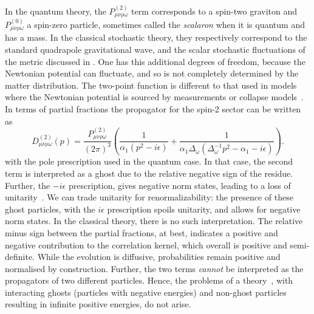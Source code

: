 \documentclass[aps,preprintnumbers,superscriptaddress,longbibliography]{revtex4-1}
\begin{document}
In the quantum theory, the $P^{(2)}_{\mu \nu \rho \omega}$ term corresponds to a spin-two graviton and  $P^{(0)}_{\mu \nu \rho \omega}$ a spin-zero particle, sometimes called the {\it scalaron} when it is quantum and has a mass. In the classical stochastic theory, they respectively correspond to the standard quadrapole gravitational wave, and the scalar stochastic fluctuations of the metric discussed in \cite{layton2023weak,oppenheim2022gravitationally,UCLNordstrom}. One has this additional degrees of freedom, because the Newtonian potential can fluctuate, and so is not completely determined by the matter distribution. The two-point function is different to that used in models where %
the Newtonian potential is sourced by measurements or collapse models~\cite{kafri2014classical,tilloy2016sourcing,tilloy2017principle}. 
In terms of partial fractions the propagator for the spin-2 sector can be written as 
\begin{equation}
    D^{(2)}_{\mu \nu \rho \omega}(p)=\frac{P^{(2)}_{\mu \nu \rho \omega}}{(2\pi)^3}\left(\frac{1}{\alpha_1(p^2-i\epsilon)}+\frac{1}{\alpha_1\Delta_\omega\left(\Delta_\omega^{-1}p^2-\alpha_1-i\epsilon\right)}\right).
    \label{eq:partialfracs}
\end{equation}
with the pole prescription used in the quantum case. In that case, the second term is interpreted as a ghost due to the relative negative sign of the residue. Further, the $-i\epsilon$ prescription, %
gives negative norm states, leading to a loss of unitarity~\cite{stelle1977renormalization,woodard2015theorem}.
We can trade unitarity for renormalizability: the presence of these ghost particles, with the $i \epsilon$ prescription spoils unitarity, and allows for negative norm states. %
In the classical theory, there is no such interpretation. The relative minus sign between the partial fractions, at best, indicates a positive and negative contribution to the correlation kernel, which overall is positive and semi-definite. While the evolution is diffusive, probabilities remain positive and normalised by construction.
Further, the two terms {\it cannot} be interpreted as the propagators of two different particles. Hence, the problems of a theory~\cite{woodard2023don}, with interacting ghosts (particles with negative energies) and non-ghost particles resulting in infinite positive energies, do not arise.
\end{document}
